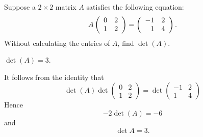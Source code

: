 \documentclass{ximera}
\begin{document}
\begin{exercise}
Suppose a $2\times 2$ matrix $A$ satisfies the following equation:
\[
A\left(\begin{array}{rr} 0 & 2\\ 1 & 2\end{array}\right) = \left(\begin{array}{rr} -1 & 2\\ 1 &4\end{array}\right).
\]
Without calculating the entries of $A$, find $\det(A)$.




\begin{solution}
\ans $\det(A) = 3$.

\soln It follows from the identity that 
\[
\det(A)\det\left(\begin{array}{rr} 0 & 2\\1 & 2 \end{array}\right) = \det\left(\begin{array}{rr} -1 & 2\\ 1 & 4 \end{array}\right)
\]
Hence
\[
-2\det(A) = -6
\]
and 
\[
\det A = 3.
\]

\end{solution}
\end{exercise}
\end{document}

